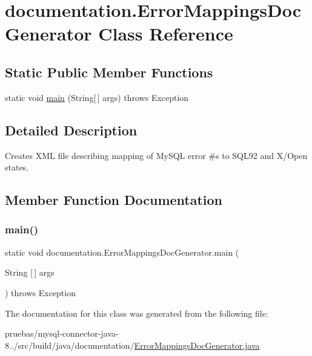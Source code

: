 \hypertarget{classdocumentation_1_1_error_mappings_doc_generator}{}\section{documentation.\+Error\+Mappings\+Doc\+Generator Class Reference}
\label{classdocumentation_1_1_error_mappings_doc_generator}
\subsection*{Static Public Member Functions}
\begin{DoxyCompactItemize}
\item 
static void \mbox{\hyperlink{classdocumentation_1_1_error_mappings_doc_generator_a4d220d7973be2cc09433cd551bdd8c28}{main}} (String\mbox{[}$\,$\mbox{]} args)  throws Exception 
\end{DoxyCompactItemize}


\subsection{Detailed Description}
Creates X\+ML file describing mapping of My\+S\+QL error \#\textquotesingle{}s to S\+Q\+L92 and X/\+Open states. 

\subsection{Member Function Documentation}
\mbox{\label{classdocumentation_1_1_error_mappings_doc_generator_a4d220d7973be2cc09433cd551bdd8c28}} 
\subsubsection{\texorpdfstring{main()}{main()}}
{\footnotesize\ttfamily static void documentation.\+Error\+Mappings\+Doc\+Generator.\+main (\begin{DoxyParamCaption}\item[{String \mbox{[}$\,$\mbox{]}}]{args }\end{DoxyParamCaption}) throws Exception\hspace{0.3cm}{\ttfamily [static]}}



The documentation for this class was generated from the following file\+:\begin{DoxyCompactItemize}
\item 
pruebas/mysql-\/connector-\/java-\/8../src/build/java/documentation/\mbox{\hyperlink{_error_mappings_doc_generator_8java}{Error\+Mappings\+Doc\+Generator.\+java}}\end{DoxyCompactItemize}
